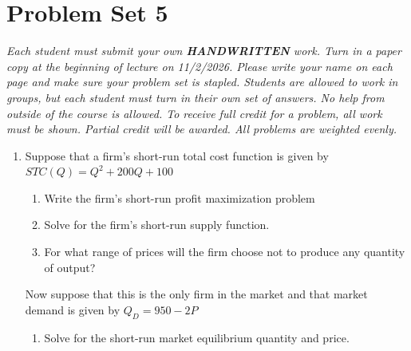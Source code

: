 \documentclass[11pt]{article}
\begin{document}
  
\section*{Problem Set 5}

\emph{Each student must submit your own \textbf{HANDWRITTEN} work. Turn in a paper copy at the beginning of lecture on 11/2/2026.  Please write your name on each page and make sure your problem set is stapled.  Students are allowed to work in groups, but each student must turn in their own set of answers.  No help from outside of the course is allowed.  To receive full credit for a problem, all work must be shown.  Partial credit will be awarded.  All problems are weighted evenly.}


\begin{enumerate}
  \item Suppose that a firm's short-run total cost function is given by $STC(Q) = Q^2 + 200Q + 100$ 
  \begin{enumerate}
  	\item Write the firm's short-run profit maximization problem
     \vspace*{25mm}  	
    \item Solve for the firm's short-run supply function.
     \vspace*{60mm}
     \item For what range of prices will the firm choose not to produce any quantity of output?
     \vspace*{20mm}       
     \end{enumerate}
    Now suppose that this is the only firm in the market and that market demand is given by $Q_D = 950 - 2P$
    \begin{enumerate}
    \item[(d)] Solve for the short-run market equilibrium quantity and price.
  \end{enumerate}
  

\end{enumerate}
\end{document}

